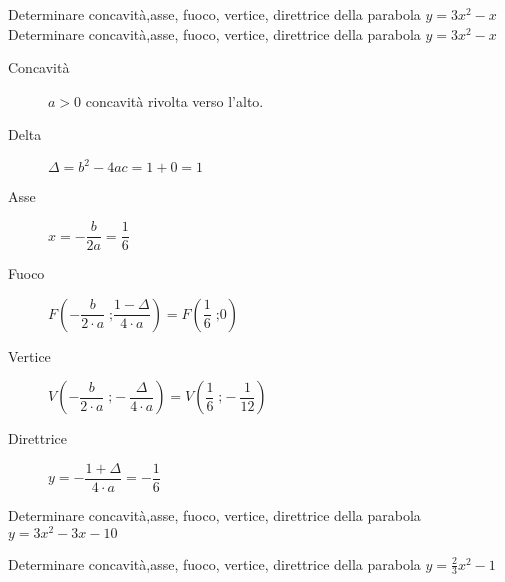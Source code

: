  \begin{exercise}
	Determinare concavità,asse, fuoco, vertice, direttrice della parabola $y=3x^2-x$
	\tcblower
	Determinare concavità,asse, fuoco, vertice, direttrice della parabola $y=3x^2-x$
	\begin{description}
		\item[Concavità] $a>0$ concavità rivolta verso l'alto.
		\item[Delta] $\Delta=b^2-4ac=1+0=1$
		\item[Asse] $x=-\dfrac{b}{2a}=\dfrac{1}{6}$
		\item[Fuoco] $F\left(-\dfrac{b}{2\cdot a}\;\text{;}\dfrac{1-\Delta}{4\cdot a}\right)=F\left(\dfrac{1}{6}\;\text{;}0\right)$
		\item[Vertice] $V\left(-\dfrac{b}{2\cdot a}\;\text{;}-\dfrac{\Delta}{4\cdot a}\right)=V\left(\dfrac{1}{6}\;\text{;}-\dfrac{1}{12}\right)$
		\item[Direttrice] $y=-\dfrac{1+\Delta}{4\cdot a}=-\dfrac{1}{6}$
	\end{description}
\end{exercise}
\begin{exercise}[no solution]
	Determinare concavità,asse, fuoco, vertice, direttrice della parabola $y=3x^2-3x-10$
\end{exercise}
\begin{exercise}[no solution]
	Determinare concavità,asse, fuoco, vertice, direttrice della parabola $y=\frac{2}{3}x^2-1$
\end{exercise}

